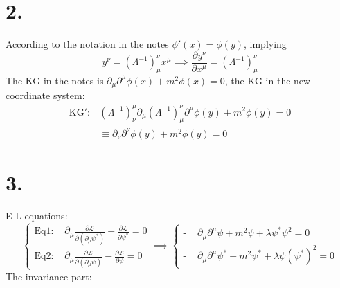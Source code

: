 \documentclass{article}
\newcommand{\pd}{\partial}  %
\newcommand{\pdm}{\partial_\mu}  %
\newcommand{\pdup}{\partial^\mu}  %
\newcommand{\Lag}{\mathcal{L}}  %
\begin{document}
\section*{2.}
According to the notation in the notes $\phi'(x) = \phi(y)$, implying
\begin{equation}
    y^\nu = (\Lambda^{-1})_\mu^\nu x^\mu \implies \frac{\partial y^\nu}{\partial x^\mu} = (\Lambda^{-1})_\mu^\nu
\end{equation}
The KG in the notes is $\partial_\mu \partial^\mu \phi(x) + m^2 \phi(x) = 0$, the KG in the new 
coordinate system:
\begin{equation}
    \begin{split}
       \text{KG}': &(\Lambda^{-1})^\mu_\nu \partial_\mu (\Lambda^{-1})_\mu^\nu \partial^\mu \phi(y) + m^2 \phi(y) = 0\\
        & \equiv \partial_\nu \partial^\nu \phi(y) + m^2\phi(y) = 0  
    \end{split}
\end{equation}

\section*{3.}
E-L equations:
\begin{equation}
    \begin{cases}
         \text{Eq1: }& \pdm \frac{\pd \Lag}{\pd (\pdm \psi^*)} - \frac{\pd \Lag}{\pd \psi^*} = 0\\
         \text{Eq2: }& \pdm \frac{\pd \Lag}{\pd (\pdm \psi)} - \frac{\pd \Lag}{\pd \psi} = 0
    \end{cases}
    \implies 
    \begin{cases}
        \text{- }& \pdm \pdup \psi + m^2 \psi + \lambda \psi^*\psi^2 = 0 \\
        \text{- }& \pdm \pdup \psi^* + m^2 \psi^* + \lambda \psi(\psi^*)^2 = 0 
    \end{cases}
\end{equation}
The invariance part:
\end{document}
